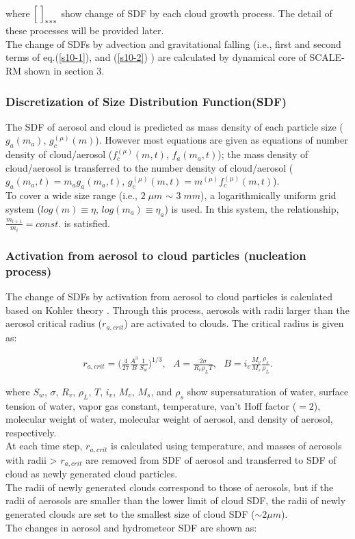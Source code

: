 where $\Bigl[\;\Bigr]_{***}$ show change of SDF by each cloud growth process. The detail of these processes will be provided later.\\
 The change of SDFs by advection and gravitational falling (i.e., first and second terms of eq.(\ref{s10-1}), and (\ref{s10-2}) ) are calculated by dynamical core of SCALE-RM shown in section 3.


\subsubsection{Discretization of Size Distribution Function(SDF)}
The SDF of aerosol and cloud is predicted as mass density of each particle size ($g_{a}(m_{a})$, $g_{c}^{(\mu)}(m)$). However most equations are given as equations of number density of cloud/aerosol ($f_{c}^{(\mu)}(m,t)$, $f_{a}(m_{a},t)$); the mass density of cloud/aerosol is transferred to the number density of cloud/aerosol ($g_{a}(m_{a},t)=m_{a}g_{a}(m_{a},t)$, $g_{c}^{(\mu)}(m,t)=m^{(\mu)}f_{c}^{(\mu)}(m,t)$).\\
To cover a wide size range (i.e., $2\;\mu m$ $\sim$ $3\;mm$), a logarithmically uniform grid system ($log(m)\equiv \eta$, $log(m_{a})\equiv \eta_{a}$) is used. In this system, the relationship, $\frac{m_{i+1}}{m_{i}}=const.$ is satisfied.

\subsubsection{Activation from aerosol to cloud particles (nucleation process)}
The change of SDFs by activation from aerosol to cloud particles is calculated based on Kohler theory \cite{kohler_1936}. Through this process, aerosols with radii larger than the aerosol critical radius ($r_{a,crit}$) are activated to clouds. The critical radius is given as:

\begin{eqnarray}
r_{a,crit}=\bigl( \frac{4}{27}\frac{A^{3}}{B}\frac{1}{S_{w}}\Bigr )^{1/3}, \:\:\:A=\frac{2\sigma}{R_{v}\rho_{L}T},\:\:\: B=i_{v}\frac{M_{v}}{M_{s}}\frac{\rho_{s}}{\rho_{L}}.\label{s10-3}
\end{eqnarray}

where $S_{w}$, $\sigma$, $R_{v}$, $\rho_{L}$, $T$, $i_{v}$, $M_{v}$, $M_{s}$, and $\rho_{s}$ show supersaturation of water, surface tension of water, vapor gas constant, temperature, van't Hoff factor ($=2$), molecular weight of water, molecular weight of aerosol, and density of aerosol, respectively.\\
At each time step, $r_{a,crit}$ is calculated using temperature, and masses of aerosols with radii > $r_{a,crit}$ are removed from SDF of aerosol and 
transferred to SDF of cloud as newly generated cloud particles.\\
The radii of newly generated clouds correspond to those of aerosols, but if the radii of aerosols are smaller than the lower limit of cloud SDF, the radii of newly generated clouds are set to the smallest size of cloud SDF ($\sim 2 \mu m$).\\
The changes in aerosol and hydrometeor SDF are shown as:

